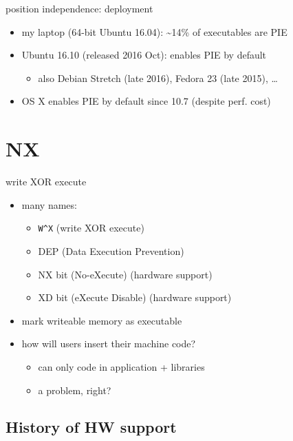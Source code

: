 \begin{frame}{position independence: deployment}
\begin{itemize}
    \item my laptop (64-bit Ubuntu 16.04): \textasciitilde 14\% of executables are PIE
    \item Ubuntu 16.10 (released 2016 Oct): enables PIE by default
        \begin{itemize}
            \item also Debian Stretch (late 2016), Fedora 23 (late 2015), \ldots
        \end{itemize}
    \item OS X enables PIE by default since 10.7 (despite perf. cost)
\end{itemize}
\end{frame}

\section{NX}


\begin{frame}[fragile,label=wxorx]{write XOR execute}
    \begin{itemize}
    \item many names:
    \begin{itemize}
        \item \verb|W^X| (write XOR execute)
        \item DEP (Data Execution Prevention)
        \item NX bit (No-eXecute) (hardware support)
        \item XD bit (eXecute Disable) (hardware support)
    \end{itemize}
    \item mark writeable memory as executable
    \item how will users insert their machine code?
        \begin{itemize}
        \item can only code in application + libraries
        \item a problem, right?
        \end{itemize}
    \end{itemize}
\end{frame}

\subsection{History of HW support}

